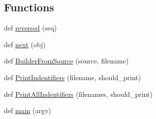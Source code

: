\subsection*{Functions}
\begin{DoxyCompactItemize}
\item 
def \hyperlink{namespacecpp_1_1ast_a0b1c00fd4aaa476b10de6b3a2550f39f}{reversed} (seq)
\item 
def \hyperlink{namespacecpp_1_1ast_a39ad8261fef5e0a7c1c17c510541b66f}{next} (obj)
\item 
def \hyperlink{namespacecpp_1_1ast_a696471f0d7971a0789824803a008cf6b}{Builder\+From\+Source} (source, filename)
\item 
def \hyperlink{namespacecpp_1_1ast_a6a793b93aff7779af7017d001ce3b226}{Print\+Indentifiers} (filename, should\+\_\+print)
\item 
def \hyperlink{namespacecpp_1_1ast_abc501124095357c1cf56eaf10e1df327}{Print\+All\+Indentifiers} (filenames, should\+\_\+print)
\item 
def \hyperlink{namespacecpp_1_1ast_acd29cc27c3bff13bf3e055575b8e958a}{main} (argv)
\end{DoxyCompactItemize}
